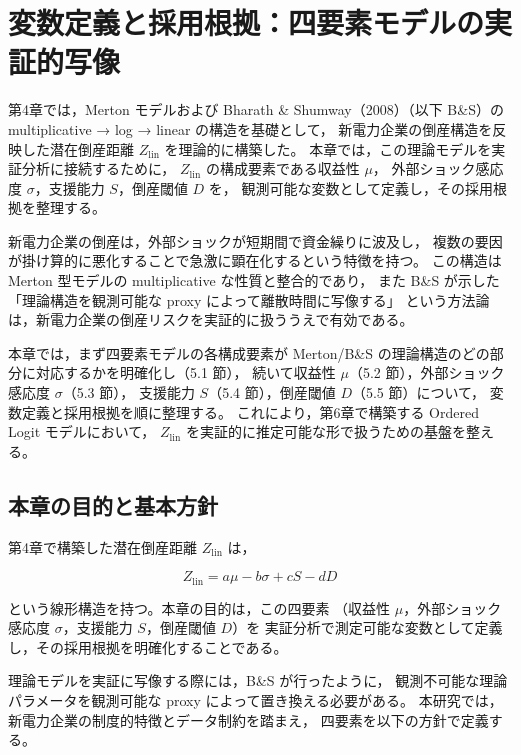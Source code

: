
\chapter{変数定義と採用根拠：四要素モデルの実証的写像}
\label{chap:variables}

第4章では，Merton モデルおよび Bharath \& Shumway（2008）（以下 B\&S）の
multiplicative → log → linear の構造を基礎として，
新電力企業の倒産構造を反映した潜在倒産距離 $Z_{\text{lin}}$ を理論的に構築した。
本章では，この理論モデルを実証分析に接続するために，
$Z_{\text{lin}}$ の構成要素である収益性 $\mu$，
外部ショック感応度 $\sigma$，支援能力 $S$，倒産閾値 $D$ を，
観測可能な変数として定義し，その採用根拠を整理する。

新電力企業の倒産は，外部ショックが短期間で資金繰りに波及し，
複数の要因が掛け算的に悪化することで急激に顕在化するという特徴を持つ。
この構造は Merton 型モデルの multiplicative な性質と整合的であり，
また B\&S が示した「理論構造を観測可能な proxy によって離散時間に写像する」
という方法論は，新電力企業の倒産リスクを実証的に扱ううえで有効である。

本章では，まず四要素モデルの各構成要素が
Merton/B\&S の理論構造のどの部分に対応するかを明確化し（5.1 節），
続いて収益性 $\mu$（5.2 節），外部ショック感応度 $\sigma$（5.3 節），
支援能力 $S$（5.4 節），倒産閾値 $D$（5.5 節）について，
変数定義と採用根拠を順に整理する。
これにより，第6章で構築する Ordered Logit モデルにおいて，
$Z_{\text{lin}}$ を実証的に推定可能な形で扱うための基盤を整える。

\section{本章の目的と基本方針}

第4章で構築した潜在倒産距離 $Z_{\text{lin}}$ は，



\[
Z_{\text{lin}} = a\mu - b\sigma + cS - dD
\]



という線形構造を持つ。本章の目的は，この四要素
（収益性 $\mu$，外部ショック感応度 $\sigma$，支援能力 $S$，倒産閾値 $D$）を
実証分析で測定可能な変数として定義し，その採用根拠を明確化することである。

理論モデルを実証に写像する際には，B\&S が行ったように，
観測不可能な理論パラメータを観測可能な proxy によって置き換える必要がある。
本研究では，新電力企業の制度的特徴とデータ制約を踏まえ，
四要素を以下の方針で定義する。

